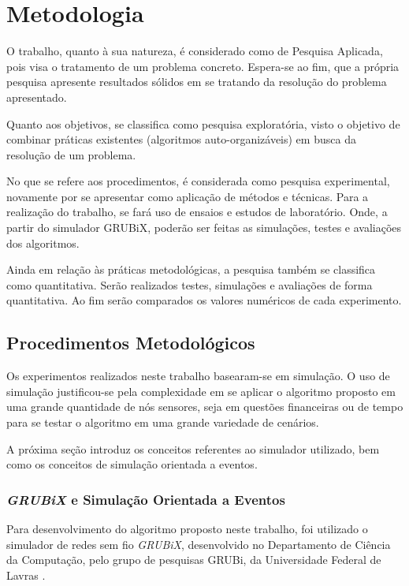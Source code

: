 \newpage\section{Metodologia}
\label{chap:Metodologia}


O trabalho, quanto à sua natureza, é considerado como de Pesquisa Aplicada, pois visa o tratamento de um problema concreto. Espera-se ao fim, que a própria pesquisa apresente resultados sólidos em se tratando da resolução do problema apresentado.

Quanto aos objetivos, se classifica como pesquisa exploratória, visto o objetivo de combinar práticas existentes (algoritmos auto-organizáveis) em busca da resolução de um problema.

No que se refere aos procedimentos, é considerada como pesquisa experimental, novamente por se apresentar como aplicação de métodos e técnicas. Para a realização do trabalho, se fará uso de ensaios e estudos de laboratório. Onde, a partir do simulador GRUBiX, poderão ser feitas as simulações, testes e avaliações dos algoritmos.
              
Ainda em relação às práticas metodológicas, a pesquisa também se classifica como quantitativa. Serão realizados testes, simulações e avaliações de forma quantitativa. Ao fim serão comparados os valores numéricos de cada experimento.

\subsection{Procedimentos Metodológicos}

Os experimentos realizados neste trabalho basearam-se em simulação. O uso de simulação justificou-se pela complexidade em se aplicar o algoritmo proposto em uma grande quantidade de nós sensores, seja em questões financeiras ou de tempo para se testar o algoritmo em uma grande variedade de cenários.

A próxima seção introduz os conceitos referentes ao simulador utilizado, bem como os conceitos de simulação orientada a eventos.

\subsubsection{\emph{GRUBiX} e Simulação Orientada a Eventos}
Para desenvolvimento do algoritmo proposto neste trabalho, foi utilizado o simulador de redes sem fio \emph{GRUBiX}, desenvolvido no Departamento de Ciência da Computação, pelo grupo de pesquisas GRUBi, da Universidade Federal de Lavras \cite{grubi}.

